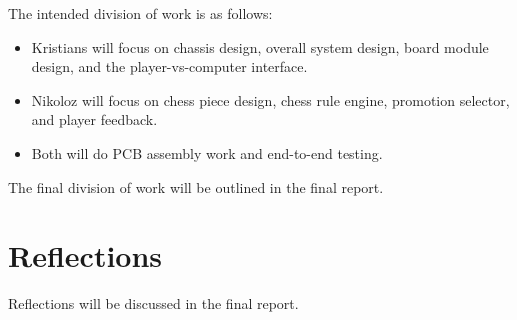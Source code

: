 \documentclass{article}
\begin{document}
The intended division of work is as follows:
\begin{itemize}
	\item Kristians will focus on chassis design, overall system design, board module design, and the player-vs-computer interface.
	\item Nikoloz will focus on chess piece design, chess rule engine, promotion selector, and player feedback.
	\item Both will do PCB assembly work and end-to-end testing.
\end{itemize}

The final division of work will be outlined in the final report.

\section{Reflections}

Reflections will be discussed in the final report.
\end{document}
